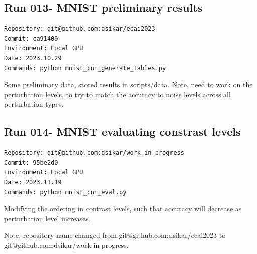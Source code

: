 \subsection{Run 013- MNIST preliminary results}
\label{app_res:013}
\begin{verbatim}
Repository: git@github.com:dsikar/ecai2023
Commit: ca91409
Environment: Local GPU
Date: 2023.10.29
Commands: python mnist_cnn_generate_tables.py
\end{verbatim}

Some preliminary data, stored results in scripts/data. Note, need to work on the perturbation levels, to try to match the accuracy to noise levels across all perturbation types.

\subsection{Run 014- MNIST evaluating constrast levels}
\label{app_res:014}
\begin{verbatim}
Repository: git@github.com:dsikar/work-in-progress
Commit: 95be2d0
Environment: Local GPU
Date: 2023.11.19
Commands: python mnist_cnn_eval.py
\end{verbatim}

Modifying the ordering in contrast levels, such that accuracy will decrease as perturbation level increases.

Note, repository name changed from git@github.com:dsikar/ecai2023 to git@github.com:dsikar/work-in-progress.

